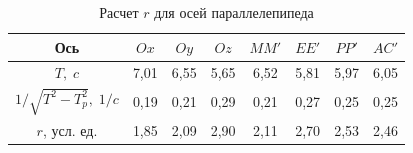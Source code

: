 \documentclass[a4paper, 12pt]{article}
\begin{document}
        \begin{table}[h]
            \centering
            \caption{Расчет $r$ для осей параллелепипеда}
            \begin{tabular}{|c|c|c|c|c|c|c|c|}
                \hline
                Ось & $Ox$ & $Oy$ & $Oz$ &
                $MM'$ & $EE'$ & $PP'$ & $AC'$ \\ 
                \hline
                $T,\;c$ & 7,01 & 6,55 & 5,65 &
                6,52  & 5,81  & 5,97  & 6,05  \\ 
                \hline
                $1/\sqrt{T^2-T^2_p},\;1/c$ & 0,19 & 0,21 & 0,29 &
                0,21  & 0,27  & 0,25  & 0,25  \\ 
                \hline
                $r$, усл. ед. & 1,85 & 2,09 & 2,90 &
                2,11  & 2,70  & 2,53  & 2,46  \\ 
                \hline
            \end{tabular}
        \end{table}
\end{document}
